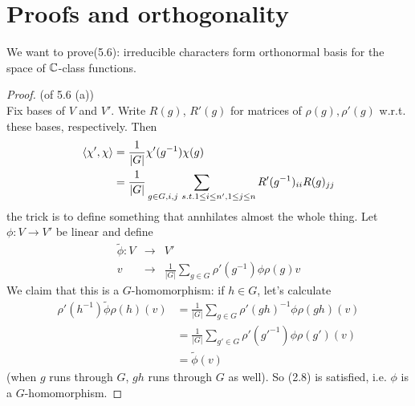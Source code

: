 \documentclass[a4paper]{article}
\begin{document}
\newpage

\section{Proofs and orthogonality}

We want to prove(5.6): irreducible characters form orthonormal basis for the space of $\mathbb{C}$-class functions.

\begin{proof} (of 5.6 (a))\\
Fix bases of $V$ and $V'$. Write $R(g)$, $R'(g)$ for matrices of $\rho(g),\rho'(g)$ w.r.t. these bases, respectively. Then
\begin{equation*}
\begin{aligned}
\langle \chi',\chi \rangle &= \frac{1}{|G|} \chi'(g^{-1}) \chi(g) \\
&= \frac{1}{|G|} \sum_{g \in G, i,j\ s.t. 1 \leq i \leq n', 1 \leq j \leq n} R'(g^{-1})_{ii} R(g)_{jj}
\end{aligned}
\end{equation*}
the trick is to define something that annhilates almost the whole thing. Let $\phi:V \to V'$ be linear and define 
\begin{equation*}
\begin{aligned}
\tilde{\phi}: V &\to &V'\\
v &\to &\frac{1}{|G|} \sum_{g \in G} \rho'(g^{-1}) \phi \rho(g) v
\end{aligned}
\end{equation*}
We claim that this is a $G$-homomorphism: if $h \in G$, let's calculate
\begin{equation*}
\begin{aligned}
\rho'(h^{-1}) \tilde{\phi} \rho(h) (v) &= \frac{1}{|G|} \sum_{g \in G} \rho' (gh)^{-1} \phi \rho(gh) (v)\\
&= \frac{1}{|G|} \sum_{g' \in G} \rho'(g'^{-1}) \phi \rho(g') (v)\\
&= \tilde{\phi} (v)
\end{aligned}
\end{equation*}
(when $g$ runs through $G$, $gh$ runs through $G$ as well). So (2.8) is satisfied, i.e. $\phi$ is a $G$-homomorphism.


\end{proof}
\end{document}

